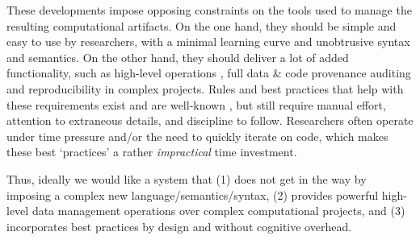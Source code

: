 \documentclass{article} %
\begin{document}
These developments impose opposing constraints on the tools used to manage the
resulting computational artifacts. On the one hand, they should be simple and
easy to use by researchers, with a minimal learning curve and unobtrusive syntax
and semantics. On the other hand, they should deliver a lot of added
functionality, such as high-level operations \citep{wickham2014tidy}, full data
\& code provenance auditing \citep{davidson2008provenance} and reproducibility
\citep{ivie2018reproducibility} in complex projects.  Rules and best practices
that help with these requirements exist and are well-known
\citep{sandve2013ten,wilkinson2016fair}, but still require manual effort,
attention to extraneous details, and discipline to follow. Researchers often
operate under time pressure and/or the need to quickly iterate on code, which
makes these best `practices' a rather \emph{impractical} time investment. 

Thus, ideally we would like a system that (1) does not get in the way by
imposing a complex new language/semantics/syntax, (2) provides powerful
high-level data management operations over complex computational projects, and
(3) incorporates best practices by design and without cognitive overhead.
\end{document}

